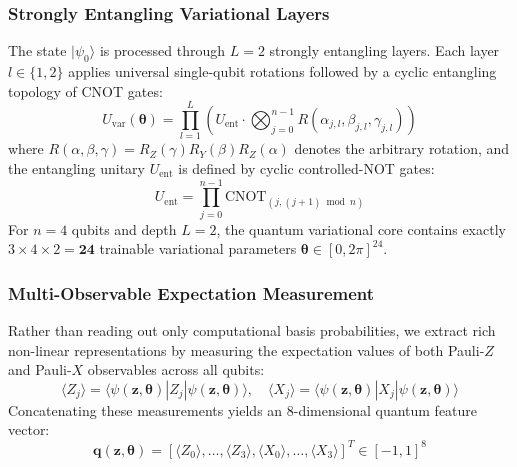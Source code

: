 \documentclass[conference]{IEEEtran}
\begin{document}
\subsubsection{Strongly Entangling Variational Layers}
The state $|\psi_0\rangle$ is processed through $L = 2$ strongly entangling layers. Each layer $l \in \{1, 2\}$ applies universal single-qubit rotations followed by a cyclic entangling topology of CNOT gates:
\begin{equation}
    U_{\text{var}}(\boldsymbol{\theta}) = \prod_{l=1}^L \left( U_{\text{ent}} \cdot \bigotimes_{j=0}^{n-1} R(\alpha_{j,l}, \beta_{j,l}, \gamma_{j,l}) \right)
\end{equation}
where $R(\alpha, \beta, \gamma) = R_Z(\gamma) R_Y(\beta) R_Z(\alpha)$ denotes the arbitrary rotation, and the entangling unitary $U_{\text{ent}}$ is defined by cyclic controlled-NOT gates:
\begin{equation}
    U_{\text{ent}} = \prod_{j=0}^{n-1} \text{CNOT}_{(j, (j+1) \bmod n)}
\end{equation}
For $n = 4$ qubits and depth $L = 2$, the quantum variational core contains exactly $3 \times 4 \times 2 = \mathbf{24}$ trainable variational parameters $\boldsymbol{\theta} \in [0, 2\pi]^{24}$.

\subsubsection{Multi-Observable Expectation Measurement}
Rather than reading out only computational basis probabilities, we extract rich non-linear representations by measuring the expectation values of both Pauli-$Z$ and Pauli-$X$ observables across all qubits:
\begin{equation}
    \langle Z_j \rangle = \langle \psi(\mathbf{z}, \boldsymbol{\theta}) | Z_j | \psi(\mathbf{z}, \boldsymbol{\theta}) \rangle, \quad
    \langle X_j \rangle = \langle \psi(\mathbf{z}, \boldsymbol{\theta}) | X_j | \psi(\mathbf{z}, \boldsymbol{\theta}) \rangle
\end{equation}
Concatenating these measurements yields an 8-dimensional quantum feature vector:
\begin{equation}
    \mathbf{q}(\mathbf{z}, \boldsymbol{\theta}) = \left[ \langle Z_0 \rangle, \dots, \langle Z_3 \rangle, \langle X_0 \rangle, \dots, \langle X_3 \rangle \right]^T \in [-1, 1]^8
\end{equation}
\end{document}
